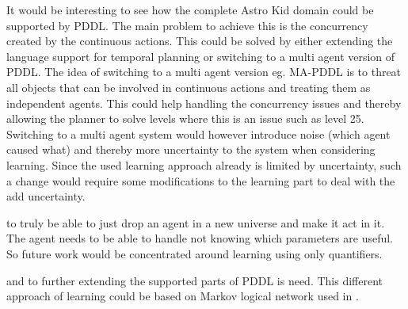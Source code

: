 	It would be interesting to see how the complete Astro Kid domain could be supported by PDDL. The main problem to achieve this is the concurrency created by the continuous actions. This could be solved by either extending the language support for temporal planning or switching to a multi agent version of PDDL. The idea of switching to a multi agent version eg. MA-PDDL is to threat all objects that can be involved in continuous actions and treating them as independent agents. This could help handling the concurrency issues and thereby allowing the planner to solve levels where this is an issue such as level 25. Switching to a multi agent system would however introduce noise (which agent caused what) and thereby more uncertainty to the system when considering learning. Since the used learning approach already is limited by uncertainty, such a change would require some modifications to the learning part to deal with the add uncertainty.  
	

	
 to truly be able to just drop an agent in a new universe and make it act in it. The agent needs to be able to handle not knowing which parameters are useful. So future work would be concentrated around learning using only quantifiers. 

		and to further extending the supported parts of PDDL is need. This different approach of learning could be based on Markov logical network used in \cite{zhuo2010a}. 
	